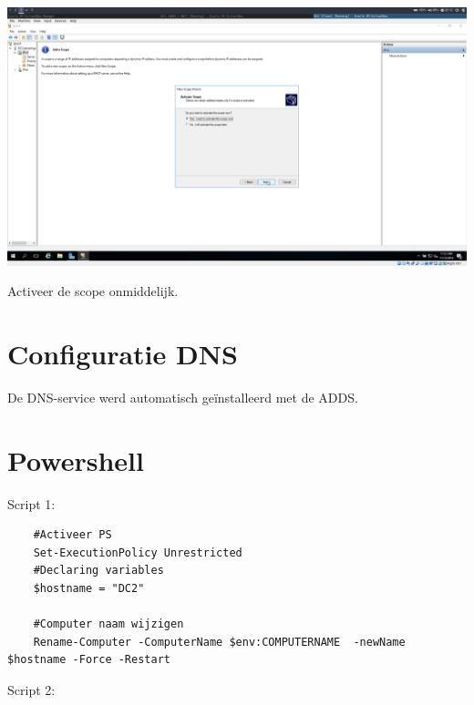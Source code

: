 \documentclass[a4paper]{article}
\begin{document}
\begin{center}
	\includegraphics[width=15cm]{Pictures/DC2/DHCP/1542309123.png}
	
	Activeer de scope onmiddelijk.
\end{center}


\section{Configuratie DNS}
De DNS-service werd automatisch geïnstalleerd met de ADDS.

\clearpage

\section{Powershell}

Script 1:

\begin{verbatim}
	#Activeer PS
	Set-ExecutionPolicy Unrestricted
	#Declaring variables
	$hostname = "DC2"
	
	#Computer naam wijzigen
	Rename-Computer -ComputerName $env:COMPUTERNAME  -newName $hostname -Force -Restart
\end{verbatim}

Script 2:
\end{document}

